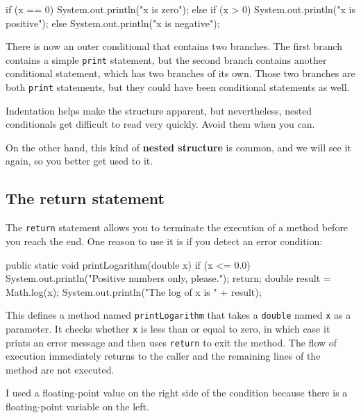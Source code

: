 \begin{code}
    if (x == 0) {
        System.out.println("x is zero");
    } else {
        if (x > 0) {
            System.out.println("x is positive");
        } else {
            System.out.println("x is negative");
        }
    }
\end{code}

There is now an outer conditional that contains two branches.
The first branch contains a simple {\tt print} statement, but the second branch contains another conditional statement, which has two branches of its own.
Those two branches are both {\tt print} statements, but they could have been conditional statements as well.

Indentation helps make the structure apparent, but nevertheless, nested conditionals get difficult to read very quickly.
Avoid them when you can.


On the other hand, this kind of {\bf nested structure} is common, and we will see it again, so you better get used to it.

\subsection{The return statement}


The {\tt return} statement allows you to terminate the execution of a method before you reach the end.
One reason to use it is if you detect an error condition:

\begin{code}
    public static void printLogarithm(double x) {
        if (x <= 0.0) {
            System.out.println("Positive numbers only, please.");
            return;
        }
        double result = Math.log(x);
        System.out.println("The log of x is " + result);
    }
\end{code}

This defines a method named {\tt printLogarithm} that takes a {\tt  double} named {\tt x} as a parameter.
It checks whether {\tt  x} is less than or equal to zero, in which case it prints an error message and then uses {\tt return} to exit the method.
The flow of execution immediately returns to the caller and the remaining lines of the method are not executed.

I used a floating-point value on the right side of the condition because there is a floating-point variable on the left.


